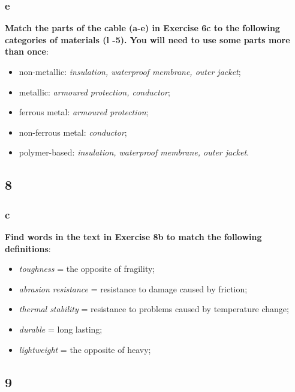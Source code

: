 \subsubsection{e}

\textbf{Match the parts of the cable (a-e) in Exercise 6c to the following categories of materials (l -5). You will need to use some parts more than once}:

\begin{itemize}

\item non-metallic: \textit{insulation, waterproof membrane, outer jacket};
\item metallic: \textit{armoured protection, conductor};
\item ferrous metal: \textit{armoured protection};
\item non-ferrous metal: \textit{conductor};
\item polymer-based: \textit{insulation, waterproof membrane, outer jacket}.

\end{itemize}

\subsection{8}

\subsubsection{c}

\textbf{Find words in the text in Exercise 8b to match the following definitions}:

\begin{itemize}

\item \textit{toughness} = the opposite of fragility;
\item \textit{abrasion resistance} = resistance to damage caused by friction;
\item \textit{thermal stability} = resistance to problems caused by temperature change;
\item \textit{durable} = long lasting;
\item \textit{lightweight} = the opposite of heavy;

\end{itemize}

\subsection{9}

